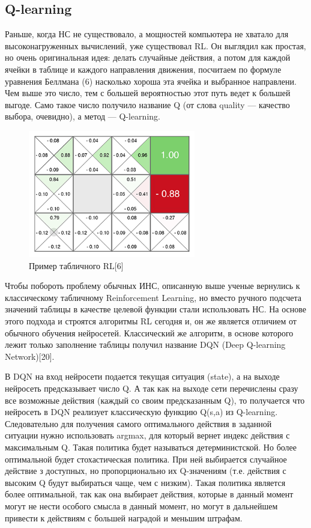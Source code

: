 \documentclass[bachelor, och, referat]{shiza}
\begin{document}
\subsection{Q-learning}
Раньше, когда НС не существовало, а мощностей компьютера не хватало для высоконагруженных вычислений, уже существовал RL. Он выглядил как простая, но очень оригинальная идея:
делать случайные действия, а потом для каждой ячейки в таблице и каждого направления движения, посчитаем по формуле уравнения Беллмана (6) насколько хороша эта ячейка и выбранное направлени. Чем
выше это число, тем с большей вероятностью этот путь ведет к большей выгоде. Само такое число получило название Q (от слова quality — качество выбора, очевидно), а метод —
Q-learning.
\begin{figure}[H]
    \centering
    \includegraphics[width=0.65\textwidth]{pic/3}
    \caption{Пример табличного RL[6]}
    \label{fig:img1}
\end{figure}
Чтобы побороть проблему обычных ИНС, описанную выше ученые вернулись к классическому табличному Reinforcement Learning, но вместо ручного подсчета значений таблицы в качестве
целевой функции стали использовать НС. На основе этого подхода и строятся алгоритмы RL сегодня и, он же является отличием от обычного обучения нейросетей. Классический же
алгоритм, в основе которого лежит только заполнение таблицы получил название DQN (Deep Q-learning Network)[20].

В DQN на вход нейросети подается текущая ситуация (state), а на выходе нейросеть предсказывает число Q. А так как на выходе сети перечислены сразу все возможные действия
(каждый со своим предсказанным Q), то получается что нейросеть в DQN реализует классическую функцию Q(s,a) из Q-learning. Следовательно для получения самого оптимального
действия в заданной ситуации нужно использовать argmax, для который вернет индекс действия с максимальным Q. Такая политика будет называться детерминистской. Но более
оптимальной будет стохастическая политика. При ней выбирается случайное действие з доступных, но пропорционально их Q-значениям (т.е. действия с высоким Q будут выбираться
чаще, чем с низким). Такая политика является более оптимальной, так как она выбирает действия, которые в данный момент могут не нести особого смысла в данный момент, но могут
в дальнейшем привести к действиям с большей наградой и меньшим штрафам.
\end{document}
